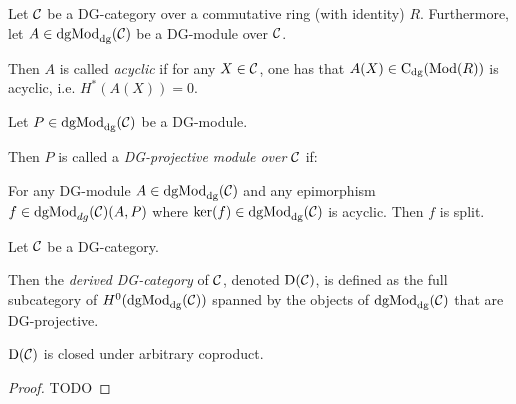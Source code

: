 
\begin{definition}
    Let \( {\mathcal{C}} \) be a DG-category over a commutative ring (with identity) \( R \). Furthermore, let \( A \in \operatorname{dgMod}_{\operatorname{dg}}({\mathcal{C}}) \) be a DG-module over \( {\mathcal{C}} \).

    Then \( A \) is called \emph{acyclic} if for any \( X \in {\mathcal{C}} \), one has that \( A(X) \in \operatorname{C}_{\operatorname{dg}}(\operatorname{Mod}(R)) \) is acyclic, i.e. \( H^*(A(X)) = 0 \).
\end{definition}

\begin{definition}
    Let \( P \in \operatorname{dgMod}_{\operatorname{dg}}({\mathcal{C}}) \) be a DG-module.

    Then \( P \) is called a \emph{DG-projective module over \( {\mathcal{C}} \)} if:
    
    For any DG-module \( A \in \operatorname{dgMod}_{\operatorname{dg}}({\mathcal{C}}) \) and any epimorphism \( f \in \operatorname{dgMod}_{dg}({\mathcal{C}})(A, P) \) where \( \ker(f) \in \operatorname{dgMod}_{\operatorname{dg}}({\mathcal{C}}) \) is acyclic. Then \( f \) is split.
\end{definition}

\begin{definition}
    Let \( {\mathcal{C}} \) be a DG-category.

    Then the \emph{derived DG-category} of \( {\mathcal{C}} \), denoted \( \operatorname{D}({\mathcal{C}}) \), is defined as the full subcategory of \( H^0(\operatorname{dgMod}_{\operatorname{dg}}({\mathcal{C}})) \) spanned by the objects of \( \operatorname{dgMod}_{\operatorname{dg}}({\mathcal{C}}) \) that are DG-projective.
\end{definition}

\begin{proposition}
    \( \operatorname{D}({\mathcal{C}}) \) is closed under arbitrary coproduct.
\end{proposition}
\begin{proof}
    TODO
\end{proof}

